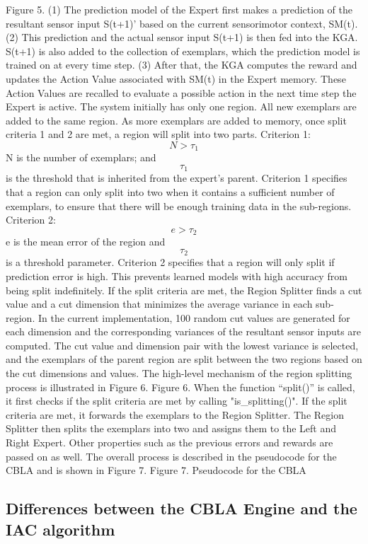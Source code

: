 Figure 5.	(1) The prediction model of the Expert first makes a prediction of the resultant sensor input S(t+1)' based on the current sensorimotor context, SM(t). (2) This prediction and the actual sensor input S(t+1) is then fed into the KGA. S(t+1) is also added to the collection of exemplars, which the prediction model is trained on at every time step. (3) After that, the KGA computes the reward and updates the Action Value associated with SM(t) in the Expert memory. These Action Values are recalled to evaluate a possible action in the next time step the Expert is active.
The system initially has only one region. All new exemplars are added to the same region. As more exemplars are added to memory, once split criteria 1 and 2 are met, a region will split into two parts.
Criterion 1: 	\[ N>\tau_1 \]
N is the number of exemplars; and \[\tau_1\] is the threshold that is inherited from the expert's parent. Criterion 1 specifies that a region can only split into two when it contains a sufficient number of exemplars, to ensure that there will be enough training data in the sub-regions. 
Criterion 2:	\[ e>\tau_2 \]	
e is the mean error of the region and \[ \tau_2 \] is a threshold parameter. Criterion 2 specifies that a region will only split if prediction error is high. This prevents learned models with high accuracy from being split indefinitely. 
If the split criteria are met, the Region Splitter finds a cut value and a cut dimension that minimizes the average variance in each sub-region. In the current implementation, 100 random cut values are generated for each dimension and the corresponding variances of the resultant sensor inputs are computed. The cut value and dimension pair with the lowest variance is selected, and the exemplars of the parent region are split between the two regions based on the cut dimensions and values. The high-level mechanism of the region splitting process is illustrated in Figure 6.
Figure 6.	When the function “split()” is called, it first checks if the split criteria are met by calling "is\_splitting()". If the split criteria are met, it forwards the exemplars to the Region Splitter. The Region Splitter then splits the exemplars into two and assigns them to the Left and Right Expert. Other properties such as the previous errors and rewards are passed on as well. 
The overall process is described in the pseudocode for the CBLA and is shown in Figure 7.
Figure 7.	Pseudocode for the CBLA


\subsection{Differences between the CBLA Engine and the IAC algorithm}

